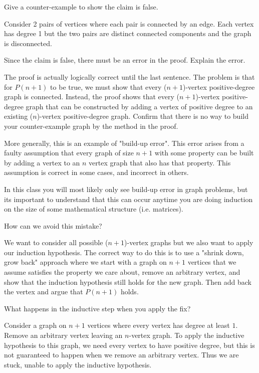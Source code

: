 \begin{questions}
\question Give a counter-example to show the claim is false.

\begin{solution} [1 in]
Consider 2 pairs of vertices where each pair is connected by an edge. Each vertex has degree 1 but the two pairs are distinct connected components and the graph is disconnected.
\end{solution}

\question Since the claim is false, there must be an error in the proof. Explain the error. 
\begin{solution} [1 in]
The proof is actually logically correct until the last sentence. The problem is that for $P(n+1)$ to be true, we must show that every ($n+1$)-vertex positive-degree graph is connected. Instead, the proof shows that every ($n+1$)-vertex positive-degree graph that can be constructed by adding a vertex of positive degree to an existing ($n$)-vertex positive-degree graph. Confirm that there is no way to build your counter-example graph by the method in the proof. 

More generally, this is an example of "build-up error". This error arises from a faulty assumption that every graph of size $n+1$ with some property can be built by adding a vertex to an $n$ vertex graph that also has that property. This assumption is correct in some cases, and incorrect in others. 

In this class you will most likely only see build-up error in graph problems, but its important to understand that this can occur anytime you are doing induction on the size of some mathematical structure (i.e. matrices). 

\end{solution}

\question How can we avoid this mistake?
\begin{solution} [1 in]
We want to consider all possible ($n+1$)-vertex graphs but we also want to apply our induction hypothesis. The correct way to do this is to use a "shrink down, grow back" approach where we start with a graph on $n+1$ vertices that we assume satisfies the property we care about, remove an arbitrary vertex, and show that the induction hypothesis still holds for the new graph. Then add back the vertex and argue that $P(n+1)$ holds. 
\end{solution}

\question What happens in the inductive step when you apply the fix?
\begin{solution} [1 in]
Consider a graph on $n+1$ vertices where every vertex has degree at least $1$. Remove an arbitrary vertex leaving an $n$-vertex graph. To apply the inductive hypothesis to this graph, we need every vertex to have positive degree, but this is not guaranteed to happen when we remove an arbitrary vertex. Thus we are stuck, unable to apply the inductive hypothesis.
\end{solution}
\end{questions}


